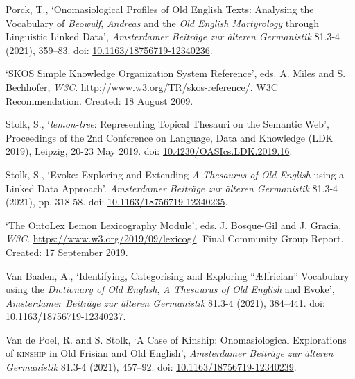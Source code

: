 \begin{list}{}
\item %
Porck, T., `Onomasiological Profiles of Old English Texts: Analysing the Vocabulary of \textit{Beowulf}, \textit{Andreas} and the \textit{Old English Martyrology} through Linguistic Linked Data', \textit{Amsterdamer Beiträge zur älteren Germanistik} 81.3-4 (2021), 359–83. doi: \href{https://doi.org/10.1163/18756719-12340236}{\url{10.1163/18756719-12340236}}.

\item %
`SKOS Simple Knowledge Organization System Reference', eds. A. Miles and S. Bechhofer, \textit{W3C}. \url{http://www.w3.org/TR/skos-reference/}. W3C Recommendation. Created: 18 August 2009.

\item %
Stolk, S., `\emph{lemon-tree}: Representing Topical Thesauri on the Semantic Web', Proceedings of the 2nd Conference on Language, Data and Knowledge (LDK 2019), Leipzig, 20-23 May 2019. doi: \href{https://doi.org/10.4230/OASIcs.LDK.2019.16}{\url{10.4230/OASIcs.LDK.2019.16}}.

\item %
Stolk, S., `Evoke: Exploring and Extending \emph{A Thesaurus of Old English} using a Linked Data Approach'. \textit{Amsterdamer Beiträge zur älteren Germanistik} 81.3-4 (2021), pp. 318-58. doi:
\href{https://doi.org/10.1163/18756719-12340235}{\url{10.1163/18756719-12340235}}.

\item %
`The OntoLex Lemon Lexicography Module', eds. J. Bosque-Gil and J. Gracia, \textit{W3C}. \url{https://www.w3.org/2019/09/lexicog/}. Final Community Group Report. Created: 17 September 2019.

\item %
Van Baalen, A., `Identifying, Categorising and Exploring ``Ælfrician'' Vocabulary using the \textit{Dictionary of Old English}, \textit{A Thesaurus of Old English} and Evoke', \textit{Amsterdamer Beiträge zur älteren Germanistik} 81.3-4 (2021), 384–441. doi: \href{https://doi.org/10.1163/18756719-12340237}{\url{10.1163/18756719-12340237}}.

\item %
Van de Poel, R. and S. Stolk, `A Case of Kinship: Onomasiological Explorations of \textsc{kinship} in Old Frisian and Old English', \textit{Amsterdamer Beiträge zur älteren Germanistik} 81.3-4 (2021), 457–92. doi: \href{https://doi.org/10.1163/18756719-12340239}{\url{10.1163/18756719-12340239}}.

\end{list}